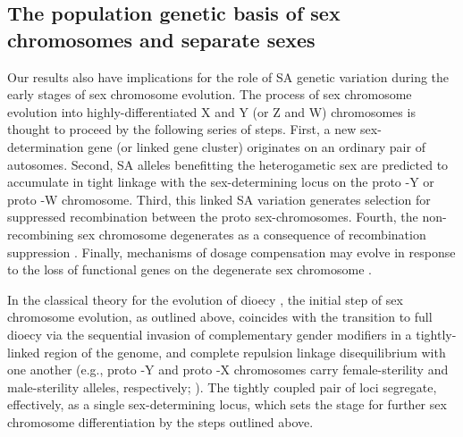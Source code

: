 \documentclass{article}
\newcommand\hl[1]{%
  \bgroup
  \hskip0pt\color{blue!80!black}%
  #1%
  \egroup
}
\begin{document}
\subsection*{The population genetic basis of sex chromosomes and separate sexes}

Our results also have implications for the role of SA genetic variation during the early stages of sex chromosome evolution. The process of sex chromosome evolution into highly-differentiated X and Y (or Z and W) chromosomes is thought to proceed by the following series of steps. First, \hl{a new sex-determination gene (or linked gene cluster)} originates on an ordinary pair of autosomes. Second, SA alleles benefitting the heterogametic sex are predicted to accumulate in tight linkage with the sex-determining locus on the \hl{proto}-Y or \hl{proto}-W chromosome. Third, this linked SA variation generates selection for suppressed recombination between the \hl{proto} sex-chromosomes. Fourth, \hl{the non-recombining sex chromosome degenerates as a consequence of recombination suppression}. Finally, mechanisms of dosage compensation may evolve in response to the loss of functional genes on the degenerate sex chromosome \citep{Rice1987, Charlesworth2002, CharlesworthEtAl2005, Bachtrog2006, Qiuetal2013, Bachtrog2014}. 

In the classical theory for the evolution of dioecy \citep{Charlesworth1978a}, the initial step of sex chromosome evolution, as outlined above, coincides with the transition to full dioecy via the sequential invasion of complementary gender modifiers in a tightly-linked region of the genome, and complete repulsion linkage disequilibrium with one another (e.g., \hl{proto}-Y and \hl{proto}-X chromosomes carry female-sterility and male-sterility alleles, respectively; \citealt{Charlesworth1978a}). The tightly coupled pair of loci segregate, effectively, as a single sex-determining locus, which sets the stage for further sex chromosome differentiation by the steps outlined above.
\end{document}
